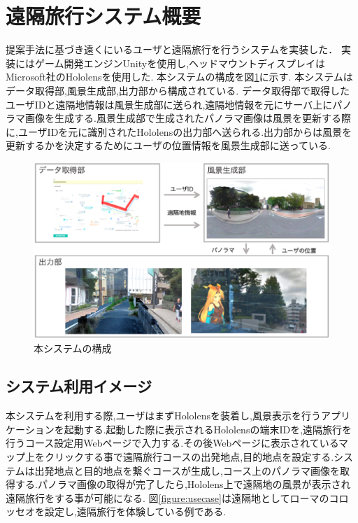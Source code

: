 
\section{遠隔旅行システム概要}

提案手法に基づき遠くにいるユーザと遠隔旅行を行うシステムを実装した．
実装にはゲーム開発エンジンUnityを使用し\cite{Unity},ヘッドマウントディスプレイはMicrosoft社のHololensを使用した\cite{Hololens}.
本システムの構成を図\ref{figure:system}に示す.
本システムはデータ取得部,風景生成部,出力部から構成されている.
データ取得部で取得したユーザIDと遠隔地情報は風景生成部に送られ,遠隔地情報を元にサーバ上にパノラマ画像を生成する.風景生成部で生成されたパノラマ画像は風景を更新する際に,ユーザIDを元に識別されたHololensの出力部へ送られる.出力部からは風景を更新するかを決定するためにユーザの位置情報を風景生成部に送っている.

\begin{figure}[ht]
 \begin{center}
  \includegraphics[width=16cm]{img/04_detail/system.eps}
  \caption{本システムの構成}
  \label{figure:system}
 \end{center}
\end{figure}

\clearpage
 
\subsection{システム利用イメージ}
本システムを利用する際,ユーザはまずHololensを装着し,風景表示を行うアプリケーションを起動する.起動した際に表示されるHololensの端末IDを,遠隔旅行を行うコース設定用Webページで入力する.その後Webページに表示されているマップ上をクリックする事で遠隔旅行コースの出発地点,目的地点を設定する.システムは出発地点と目的地点を繋ぐコースが生成し,コース上のパノラマ画像を取得する.パノラマ画像の取得が完了したら,Hololens上で遠隔地の風景が表示され遠隔旅行をする事が可能になる.
図\ref{figure:usecase}は遠隔地としてローマのコロッセオを設定し,遠隔旅行を体験している例である.


